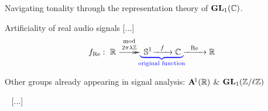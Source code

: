 \documentclass[letterpaper,11pt, reqno]{amsart}
\makeatletter
\newtheorem{monodromy theorem}{Monodromy Theorem}[subsection]
\newtheorem{wild conjecture}[theorem]{Wild Conjecture}
\newtheorem{research objectives}{Research objectives}[subsection]
\newtheorem{research question}[theorem]{Research questions}
\newtheorem{aside question}[theorem]{Aside question}
\newtheorem{audio example}[theorem]{\loudspeaker[3] Example}
\newtheorem{blank remark}[theorem]{}
\newtheorem{terminology and comment}[theorem]{Terminology and comment}
\newtheorem{purity hypothesis}[theorem]{Purity hypothesis}
\newtheorem{corollary of the purity hypothesis}[theorem]{Corollary of the purity hypothesis}
\newcommand{\CC} {{\mathbb C}}
\newcommand{\RR} {{\mathbb R}}
\newcommand{\ZZ} {{\mathbb Z}}
\newcommand{\epi}{\!\xymatrix{{}\ar@{->>}[r]&{}}\!}
\numberwithin{equation}{theorem}
\makeatother
\begin{document}
\begin{section}{Navigating tonality through the representation theory of $\bold{GL}_{1}(\CC)$.}
\begin{subsection}{Artificiality of real audio signals}
	{\color{red} [...]}
	$$
	f_{\text{Re}}:\ 
	\RR\overset{\text{mod}}{\overset{2\pi\lambda\ZZ}{\epi}}\!\!{\color{blue} \underset{\!\!\!\!\text{original function}\!\!\!\!}{\underbrace{\ \ \!{\color{black} \mathbb{S}^{1}\!\xrightarrow{\ \ f\ \ }\CC}\ }}}\!\!\xrightarrow{\ \ \text{Re}\ \ }\RR
	$$
\end{subsection}

\end{section}

\vskip 1cm

\begin{section}{Other groups already appearing in signal analysis: $\bold{A}^{\!1}(\RR)$ \& $\bold{GL}_{1}(\ZZ/\ell\ZZ)$}

\ {\color{red} [...]}

\end{section}

\vskip 1cm
\end{document}
